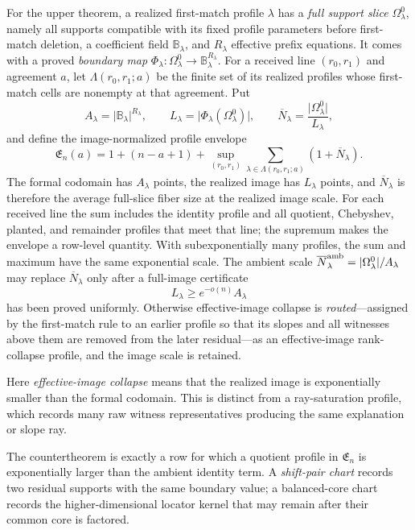 \documentclass[12pt,a4paper]{amsart}
\numberwithin{equation}{section}
\theoremstyle{remark}
\newcommand{\B}{\mathbb B}
\newcommand{\barN}{\overline N}
\newcommand{\abs}[1]{\lvert #1\rvert}
\begin{document}
For the upper theorem, a realized first-match profile \(\lambda\) has a
\emph{full support slice} \(\Omega^0_\lambda\), namely all supports
compatible with its fixed profile parameters before first-match deletion,
a coefficient field \(\B_\lambda\), and \(R_\lambda\) effective prefix
equations.  It comes with a proved \emph{boundary map}
\(\Phi_\lambda:\Omega^0_\lambda\to\B_\lambda^{R_\lambda}\).
For a received line \((r_0,r_1)\) and agreement \(a\), let
\(\Lambda(r_0,r_1;a)\) be the finite set of its realized profiles whose
first-match cells are nonempty at that agreement.  Put
\[
 A_\lambda=\abs{\B_\lambda}^{R_\lambda},\qquad
 L_\lambda=\abs{\Phi_\lambda(\Omega^0_\lambda)},\qquad
 \barN_\lambda=\frac{\abs{\Omega^0_\lambda}}{L_\lambda},
\]
and define the image-normalized profile envelope
\[
 \mathfrak E_n(a)=1+(n-a+1)+
 \sup_{(r_0,r_1)}
 \sum_{\lambda\in\Lambda(r_0,r_1;a)}(1+\barN_\lambda).
 \tag{1.6}\label{eq:profile-envelope}
\]
The formal codomain has \(A_\lambda\) points, the realized image has
\(L_\lambda\) points, and \(\barN_\lambda\) is therefore the average
full-slice fiber size at the realized image scale.  For each received line
the sum includes the identity profile and all
quotient, Chebyshev, planted, and remainder profiles that meet that line;
the supremum makes the envelope a row-level quantity.  With subexponentially
many profiles, the sum and maximum have the same exponential scale.  The
ambient scale
\(\barN_\lambda^{\rm amb}=|\Omega^0_\lambda|/A_\lambda\) may replace
\(\barN_\lambda\) only after a full-image certificate
\[
 L_\lambda\ge e^{-o(n)}A_\lambda                       \tag{FI}
\]
has been proved uniformly.  Otherwise effective-image collapse is
\emph{routed}---assigned by the first-match rule to an earlier profile so
that its slopes and all witnesses above them are removed from the later
residual---as an effective-image rank-collapse profile, and the image scale
is retained.

Here
\emph{effective-image collapse} means that the realized image is
exponentially smaller than the formal codomain.  This is distinct from a
ray-saturation profile, which records many raw witness representatives
producing the same explanation or slope ray.

The countertheorem is exactly a row for which a quotient profile in
\(\mathfrak E_n\) is exponentially larger than the ambient identity term.
A \emph{shift-pair chart} records two residual supports with the same
boundary value; a balanced-core chart records the higher-dimensional
locator kernel that may remain after their common core is factored.
\end{document}
